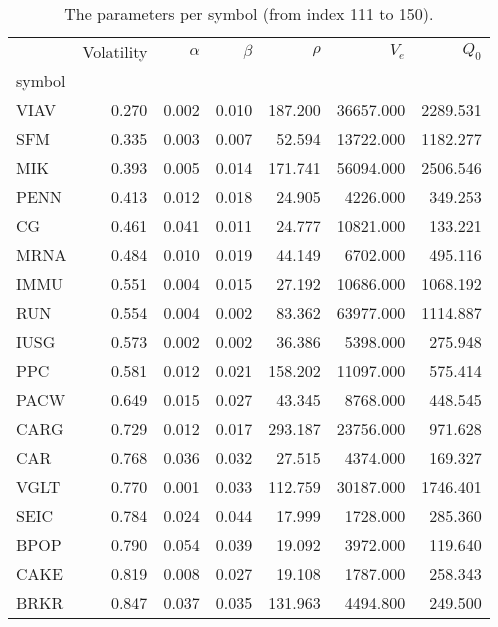 \begin{table}
\centering
\caption{The parameters per symbol (from index 111 to 150).}
\label{tbl:params_2}
\begin{tabular}{lrrrrrr}
\toprule
{} &  Volatility &  $\alpha$ &  $\beta$ &  $\rho$ &    $V_e$  &   $Q_0$  \\
symbol &             &           &          &         &           &          \\
\midrule
VIAV   &       0.270 &     0.002 &    0.010 & 187.200 & 36657.000 & 2289.531 \\
SFM    &       0.335 &     0.003 &    0.007 &  52.594 & 13722.000 & 1182.277 \\
MIK    &       0.393 &     0.005 &    0.014 & 171.741 & 56094.000 & 2506.546 \\
PENN   &       0.413 &     0.012 &    0.018 &  24.905 &  4226.000 &  349.253 \\
CG     &       0.461 &     0.041 &    0.011 &  24.777 & 10821.000 &  133.221 \\
MRNA   &       0.484 &     0.010 &    0.019 &  44.149 &  6702.000 &  495.116 \\
IMMU   &       0.551 &     0.004 &    0.015 &  27.192 & 10686.000 & 1068.192 \\
RUN    &       0.554 &     0.004 &    0.002 &  83.362 & 63977.000 & 1114.887 \\
IUSG   &       0.573 &     0.002 &    0.002 &  36.386 &  5398.000 &  275.948 \\
PPC    &       0.581 &     0.012 &    0.021 & 158.202 & 11097.000 &  575.414 \\
PACW   &       0.649 &     0.015 &    0.027 &  43.345 &  8768.000 &  448.545 \\
CARG   &       0.729 &     0.012 &    0.017 & 293.187 & 23756.000 &  971.628 \\
CAR    &       0.768 &     0.036 &    0.032 &  27.515 &  4374.000 &  169.327 \\
VGLT   &       0.770 &     0.001 &    0.033 & 112.759 & 30187.000 & 1746.401 \\
SEIC   &       0.784 &     0.024 &    0.044 &  17.999 &  1728.000 &  285.360 \\
BPOP   &       0.790 &     0.054 &    0.039 &  19.092 &  3972.000 &  119.640 \\
CAKE   &       0.819 &     0.008 &    0.027 &  19.108 &  1787.000 &  258.343 \\
BRKR   &       0.847 &     0.037 &    0.035 & 131.963 &  4494.800 &  249.500 \\

\end{tabular}
\end{table}
